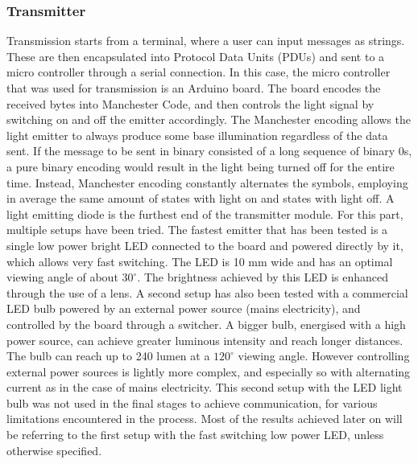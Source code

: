 \subsubsection{Transmitter}
Transmission starts from a terminal, where a user can input messages as strings. These are then encapsulated into Protocol Data Units (PDUs) and sent to a micro controller through a serial connection.
In this case, the micro controller that was used for transmission is an Arduino board.
The board encodes the received bytes into Manchester Code, and then controls the light signal by switching on and off the emitter accordingly.
The Manchester encoding allows the light emitter to always produce some base illumination regardless of the data sent. 
If the message to be sent in binary consisted of a long sequence of binary 0s, a pure binary encoding would result in the light being turned off for the entire time.
Instead, Manchester encoding constantly alternates the symbols, employing in average the same amount of states with light on and states with light off.
A light emitting diode is the furthest end of the transmitter module.
For this part, multiple setups have been tried.
The fastest emitter that has been tested is a single low power bright LED connected to the board and powered directly by it, which allows very fast switching.
The LED is 10 mm wide and has an optimal viewing angle of about $30^{\circ}$.
The brightness achieved by this LED is enhanced through the use of a lens.
A second setup has also been tested with a commercial LED bulb powered by an external power source (mains electricity), and controlled by the board through a switcher. 
A bigger bulb, energised with a high power source, can achieve greater luminous intensity and reach longer distances.
The bulb can reach up to 240 lumen at a $120^{\circ}$ viewing angle.
However controlling external power sources is lightly more complex, and especially so with alternating current as in the case of mains electricity.
This second setup with the LED light bulb was not used in the final stages to achieve communication, for various limitations encountered in the process.
Most of the results achieved later on will be referring to the first setup with the fast switching low power LED, unless otherwise specified.

